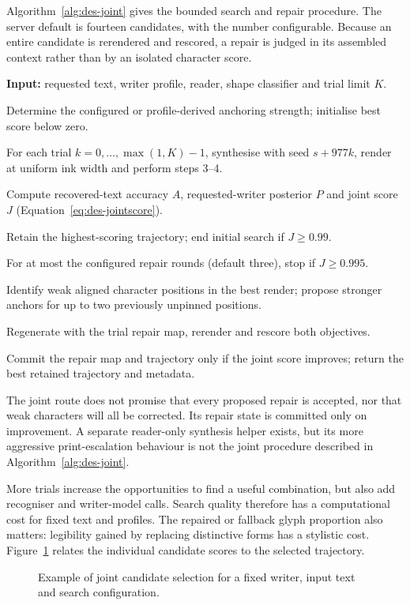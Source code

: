 Algorithm~\ref{alg:des-joint} gives the bounded search and repair procedure. The server default is fourteen candidates, with the number configurable. Because an entire candidate is rerendered and rescored, a repair is judged in its assembled context rather than by an isolated character score.
\begin{designalgorithm}
\caption{Joint candidate search and bounded legibility repair}
\label{alg:des-joint}
\textbf{Input:} requested text, writer profile, reader, shape classifier and trial limit $K$.
\begin{designsteps}
\item Determine the configured or profile-derived anchoring strength; initialise best score below zero.
\item For each trial $k=0,\ldots,\max(1,K)-1$, synthesise with seed $s+977k$, render at uniform ink width and perform steps 3--4.
\item Compute recovered-text accuracy $A$, requested-writer posterior $P$ and joint score $J$ (Equation~\ref{eq:des-jointscore}).
\item Retain the highest-scoring trajectory; end initial search if $J\geq0.99$.
\item For at most the configured repair rounds (default three), stop if $J\geq0.995$.
\item Identify weak aligned character positions in the best render; propose stronger anchors for up to two previously unpinned positions.
\item Regenerate with the trial repair map, rerender and rescore both objectives.
\item Commit the repair map and trajectory only if the joint score improves; return the best retained trajectory and metadata.
\end{designsteps}
\end{designalgorithm}
The joint route does not promise that every proposed repair is accepted, nor that weak characters will all be corrected. Its repair state is committed only on improvement. A separate reader-only synthesis helper exists, but its more aggressive print-escalation behaviour is not the joint procedure described in Algorithm~\ref{alg:des-joint}.

More trials increase the opportunities to find a useful combination, but also add recogniser and writer-model calls. Search quality therefore has a computational cost for fixed text and profiles. The repaired or fallback glyph proportion also matters: legibility gained by replacing distinctive forms has a stylistic cost. Figure~\ref{fig:des-candidates} relates the individual candidate scores to the selected trajectory.
\begin{figure}[!htbp]\centering
{}
\caption{Example of joint candidate selection for a fixed writer, input text and search configuration.}
\label{fig:des-candidates}
\end{figure}

